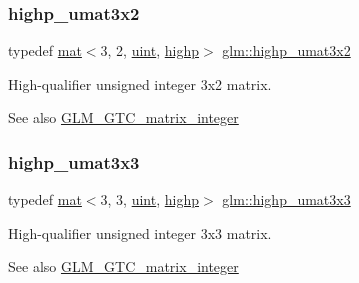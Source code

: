 \subsubsection{\texorpdfstring{highp\+\_\+umat3x2}{highp\_umat3x2}}
{\footnotesize\ttfamily typedef \mbox{\hyperlink{structglm_1_1mat}{mat}}$<$3, 2, \mbox{\hyperlink{group__core__precision_ga4fd29415871152bfb5abd588334147c8}{uint}}, \mbox{\hyperlink{namespaceglm_a36ed105b07c7746804d7fdc7cc90ff25ac6f7eab42eacbb10d59a58e95e362074}{highp}}$>$ \mbox{\hyperlink{group__gtc__matrix__integer_ga91ed05f00d470b2448e024af7e244f49}{glm\+::highp\+\_\+umat3x2}}}

High-\/qualifier unsigned integer 3x2 matrix. \begin{DoxySeeAlso}{See also}
\mbox{\hyperlink{group__gtc__matrix__integer}{G\+L\+M\+\_\+\+G\+T\+C\+\_\+matrix\+\_\+integer}} 
\end{DoxySeeAlso}
\mbox{\label{group__gtc__matrix__integer_gaa389f5f7427d2578424ddc12ce120af3}} 
\subsubsection{\texorpdfstring{highp\+\_\+umat3x3}{highp\_umat3x3}}
{\footnotesize\ttfamily typedef \mbox{\hyperlink{structglm_1_1mat}{mat}}$<$3, 3, \mbox{\hyperlink{group__core__precision_ga4fd29415871152bfb5abd588334147c8}{uint}}, \mbox{\hyperlink{namespaceglm_a36ed105b07c7746804d7fdc7cc90ff25ac6f7eab42eacbb10d59a58e95e362074}{highp}}$>$ \mbox{\hyperlink{group__gtc__matrix__integer_gaa389f5f7427d2578424ddc12ce120af3}{glm\+::highp\+\_\+umat3x3}}}

High-\/qualifier unsigned integer 3x3 matrix. \begin{DoxySeeAlso}{See also}
\mbox{\hyperlink{group__gtc__matrix__integer}{G\+L\+M\+\_\+\+G\+T\+C\+\_\+matrix\+\_\+integer}} 
\end{DoxySeeAlso}
\mbox{\label{group__gtc__matrix__integer_ga6df8a72a571bcd26ade637bf069b5562}} 
